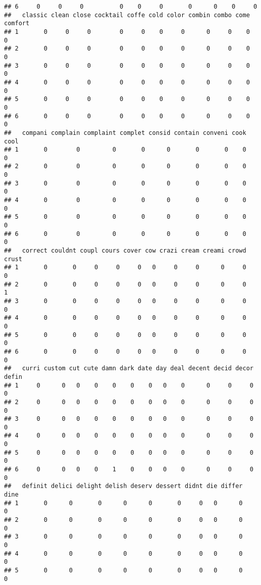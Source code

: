 \documentclass[]{article}
\begin{document}
\begin{verbatim}
## 6     0     0     0          0    0     0       0      0    0     0
##   classic clean close cocktail coffe cold color combin combo come comfort
## 1       0     0     0        0     0    0     0      0     0    0       0
## 2       0     0     0        0     0    0     0      0     0    0       0
## 3       0     0     0        0     0    0     0      0     0    0       0
## 4       0     0     0        0     0    0     0      0     0    0       0
## 5       0     0     0        0     0    0     0      0     0    0       0
## 6       0     0     0        0     0    0     0      0     0    0       0
##   compani complain complaint complet consid contain conveni cook cool
## 1       0        0         0       0      0       0       0    0    0
## 2       0        0         0       0      0       0       0    0    0
## 3       0        0         0       0      0       0       0    0    0
## 4       0        0         0       0      0       0       0    0    0
## 5       0        0         0       0      0       0       0    0    0
## 6       0        0         0       0      0       0       0    0    0
##   correct couldnt coupl cours cover cow crazi cream creami crowd crust
## 1       0       0     0     0     0   0     0     0      0     0     0
## 2       0       0     0     0     0   0     0     0      0     0     1
## 3       0       0     0     0     0   0     0     0      0     0     0
## 4       0       0     0     0     0   0     0     0      0     0     0
## 5       0       0     0     0     0   0     0     0      0     0     0
## 6       0       0     0     0     0   0     0     0      0     0     0
##   curri custom cut cute damn dark date day deal decent decid decor defin
## 1     0      0   0    0    0    0    0   0    0      0     0     0     0
## 2     0      0   0    0    0    0    0   0    0      0     0     0     0
## 3     0      0   0    0    0    0    0   0    0      0     0     0     0
## 4     0      0   0    0    0    0    0   0    0      0     0     0     0
## 5     0      0   0    0    0    0    0   0    0      0     0     0     0
## 6     0      0   0    0    1    0    0   0    0      0     0     0     0
##   definit delici delight delish deserv dessert didnt die differ dine
## 1       0      0       0      0      0       0     0   0      0    0
## 2       0      0       0      0      0       0     0   0      0    0
## 3       0      0       0      0      0       0     0   0      0    0
## 4       0      0       0      0      0       0     0   0      0    0
## 5       0      0       0      0      0       0     0   0      0    0

\end{verbatim}
\end{document}

